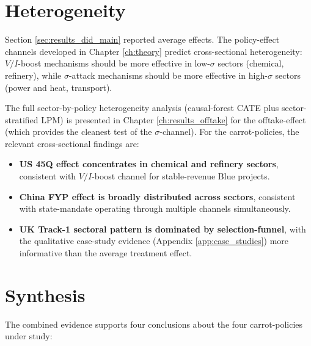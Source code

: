 \section{Heterogeneity}
\label{sec:results_did_heterogeneity}

Section \ref{sec:results_did_main} reported average effects. The policy-effect channels developed in Chapter \ref{ch:theory} predict cross-sectional heterogeneity: $V/I$-boost mechanisms should be more effective in low-$\sigma$ sectors (chemical, refinery), while $\sigma$-attack mechanisms should be more effective in high-$\sigma$ sectors (power and heat, transport).

The full sector-by-policy heterogeneity analysis (causal-forest CATE plus sector-stratified LPM) is presented in Chapter \ref{ch:results_offtake} for the offtake-effect (which provides the cleanest test of the $\sigma$-channel). For the carrot-policies, the relevant cross-sectional findings are:

\begin{itemize}[leftmargin=2em]
\item \textbf{US 45Q effect concentrates in chemical and refinery sectors}, consistent with $V/I$-boost channel for stable-revenue Blue projects.
\item \textbf{China FYP effect is broadly distributed across sectors}, consistent with state-mandate operating through multiple channels simultaneously.
\item \textbf{UK Track-1 sectoral pattern is dominated by selection-funnel}, with the qualitative case-study evidence (Appendix \ref{app:case_studies}) more informative than the average treatment effect.
\end{itemize}

\section{Synthesis}
\label{sec:results_did_discussion}

The combined evidence supports four conclusions about the four carrot-policies under study:

